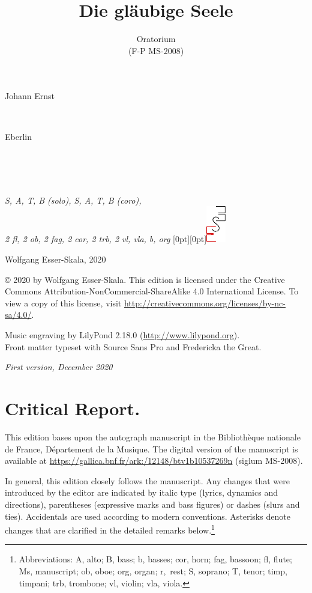 \documentclass[parskip=full]{scrreprt}
\makeatletter
\DeclareRobustCommand{\sbseries}{\fontseries{sb}\selectfont}
\newcommand\fancytitlehead{
	\headingfont%
	\fontsize{80}{80}\selectfont\textcolor{black!80}{\@ifundefined{@shortname}{\@lastname}{\@shortname}.}\\[15pt]%
	\fontsize{60}{60}\selectfont\@ifundefined{@shorttitle}{\@title}{\@shorttitle}.%
}
\def\firstname#1{\def\@firstname{#1}}
\def\lastname#1{\def\@lastname{#1}}
\def\instrumentation#1{\def\@instrumentation{#1}}
\def\maketitle{%
\begin{titlepage}%
	\Large%
	{\@titlehead}%
	\vfill%
	{\strut\@firstname}\\%
	{\sbseries\color{oldred}\strut\@lastname}\\%
	{\strut\@namesuffix}%
	\vfill%
	{\sbseries\@title}\\%
	{\@subtitle}\\[\baselineskip]%
	{\itshape\@instrumentation}%
	\vfill%
	{\itshape\@parts}\hspace*{\fill}\raisebox{0pt}[0pt][0pt]{\includegraphics{ees_logo}}%
\end{titlepage}%
}
\newif\ifprintreport\printreportfalse
\makeatother
\begin{document}
\frenchspacing

\titlehead{\fancytitlehead}
\firstname{Johann Ernst}
\lastname{Eberlin}
\title{Die gläubige Seele}
\subtitle{Oratorium\\(F-P MS-2008)}
\instrumentation{S, A, T, B (solo), S, A, T, B (coro),\\2 fl, 2 ob, 2 fag, 2 cor, 2 trb, 2 vl, vla, b, org}
\maketitle


\thispagestyle{empty}

\vspace*{\fill}

\hspace*{1em}Wolfgang Esser-Skala, 2020

© 2020 by Wolfgang Esser-Skala. This edition is licensed under the Creative Commons Attribution-NonCommercial-ShareAlike 4.0 International License. To view a copy of this license, visit \url{http://creativecommons.org/licenses/by-nc-sa/4.0/}.

Music engraving by LilyPond 2.18.0 (\url{http://www.lilypond.org}).\\
Front matter typeset with Source Sans Pro and Fredericka the Great.

\textit{First version, December 2020}

\vspace*{2cm}

\ifprintreport
\chapter*{Critical Report.}

This edition bases upon the autograph manuscript in the Bibliothèque nationale de France, Département de la Musique. The digital version of the manuscript is available at \url{https://gallica.bnf.fr/ark:/12148/btv1b10537269n} (siglum MS-2008).

In general, this edition closely follows the manuscript. Any changes that were introduced by the editor are indicated by italic type (lyrics, dynamics and directions), parentheses (expressive marks and bass figures) or dashes (slurs and ties). Accidentals are used according to modern conventions. Asterisks denote changes that are clarified in the detailed remarks below.\footnote{Abbreviations: A, alto; B, bass; b, basses; cor, horn; fag, bassoon; fl, flute; Ms, manuscript; ob, oboe; org, organ; r,~rest; S, soprano; T, tenor; timp, timpani; trb, trombone; vl, violin; vla, viola.}
\end{document}
